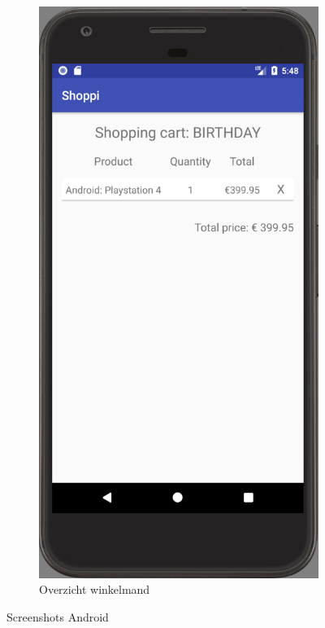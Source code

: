 \begin{figure}[H]
\begin{subfigure}{.5\textwidth}
	\includegraphics[width=0.65\linewidth]{img/poc/android/4.png}
	\caption{Overzicht winkelmand}
	\label{fig:sub2}
\end{subfigure}
	\caption{Screenshots Android}
	\label{fig:test}
\end{figure}

